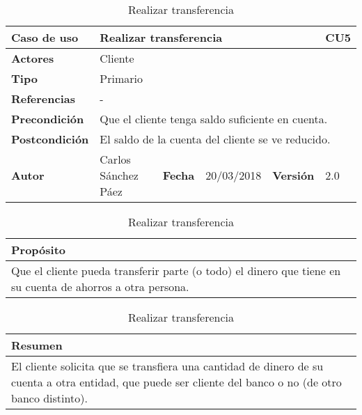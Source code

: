 \documentclass[12pt,spanish]{article}
\begin{document}
\begin{table}[H]
\centering
\begin{tabular}{|m{3cm}|m{4cm}|m{2cm}|m{2cm}|m{2cm}|m{1cm}|}
\hline
\textbf{Caso de uso} &  \multicolumn{4}{m{11cm}|}{Realizar transferencia} \vline &  \cellcolor{gray!40}CU5 \\
\hline
\textbf{Actores} & \multicolumn{5}{m{8cm}|}{Cliente} \\
\hline
\textbf{Tipo} & \multicolumn{5}{m{11cm}|}{Primario} \\
\hline
\textbf{Referencias} &\multicolumn{5}{m{11cm}|}{-} \\
\hline
\textbf{Precondición} & \multicolumn{5}{m{11cm}|}{Que el cliente tenga saldo suficiente en cuenta.} \\
\hline
\textbf{Postcondición} & \multicolumn{5}{m{11cm}|}{El saldo de la cuenta del cliente se ve reducido.} \\
\hline
\textbf{Autor} & Carlos Sánchez Páez & \textbf{Fecha} & 20/03/2018 & \textbf{Versión} & 2.0 \\
\hline
\end{tabular}

\vspace{1cm}

\begin{tabular}{|m{16.2cm}|}
\hline
\textbf{Propósito} \\
\hline
Que el cliente pueda transferir parte (o todo) el dinero que tiene en su cuenta de ahorros a otra persona. \\
\hline
\end{tabular}

\vspace{1cm}

\begin{tabular}{|m{16.2cm}|}
\hline
\textbf{Resumen} \\
\hline
El cliente solicita que se transfiera una cantidad de dinero de su cuenta a otra entidad, que puede ser cliente del banco o no (de otro banco distinto). \\
\hline
\end{tabular}

\caption{Realizar transferencia}

\end{table}


 

\end{document}
